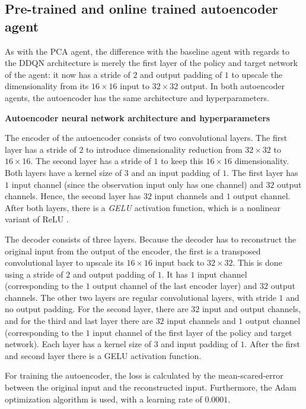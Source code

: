 \subsection{Pre-trained and online trained autoencoder agent} %
As with the PCA agent, the difference with the baseline agent with regards to the DDQN architecture is merely the first layer of the policy and target network of the agent: it now has a stride of $2$ and output padding of $1$ to upscale the dimensionality from its $16 \times 16$ input to $32 \times 32$ output. In both autoencoder agents, the autoencoder has the same architecture and hyperparameters.\newline\par

\noindent \textbf{Autoencoder neural network architecture and hyperparameters} \par
\noindent The encoder of the autoencoder consists of two convolutional layers. The first layer has a stride of $2$ to introduce dimensionality reduction from $32 \times 32$ to $16 \times 16$. The second layer has a stride of $1$ to keep this $16 \times 16$ dimensionality. Both layers have a kernel size of $3$ and an input padding of $1$. The first layer has $1$ input channel (since the observation input only has one channel) and $32$ output channels. Hence, the second layer has $32$ input channels and $1$ output channel. After both layers, there is a \emph{GELU} activation function, which is a nonlinear variant of ReLU \cite{gelu}.

The decoder consists of three layers. Because the decoder has to reconstruct the original input from the output of the encoder, the first is a transposed convolutional layer to upscale its $16 \times 16$ input back to $32 \times 32$. This is done using a stride of $2$ and output padding of $1$. It has $1$ input channel (corresponding to the $1$ output channel of the last encoder layer) and $32$ output channels. The other two layers are regular convolutional layers, with stride $1$ and no output padding. For the second layer, there are $32$ input and output channels, and for the third and last layer there are $32$ input channels and $1$ output channel (corresponding to the $1$ input channel of the first layer of the policy and target network). Each layer has a kernel size of $3$ and input padding of $1$. After the first and second layer there is a GELU activation function.

For training the autoencoder, the loss is calculated by the mean-scared-error between the original input and the reconstructed input. Furthermore, the Adam optimization algorithm is used, with a learning rate of $0.0001$. 



